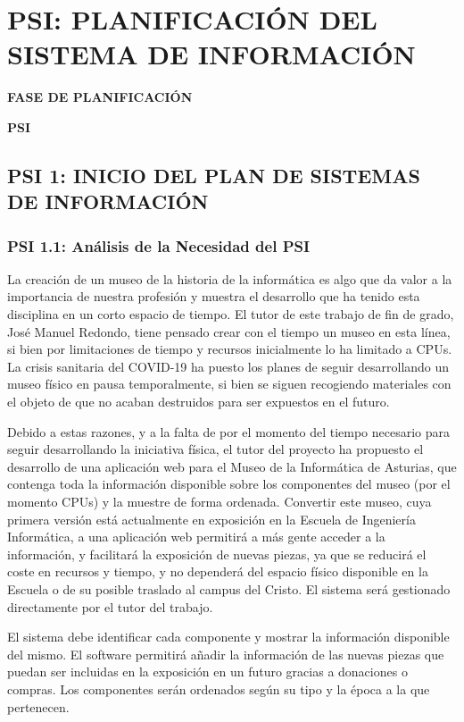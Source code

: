 \pagestyle{fancy}
\chapter{PSI: PLANIFICACIÓN DEL SISTEMA DE INFORMACIÓN}

	\vspace{2cm}	
	\begin{center}
	{\Large \textbf{FASE DE PLANIFICACIÓN} \par}
	\end{center}
	\vspace{5cm}
	
	\begin{center}
	\Huge \textbf{PSI}\par
	\end{center}

\newpage

\section{PSI 1: INICIO DEL PLAN DE SISTEMAS DE INFORMACIÓN}

\subsection{PSI 1.1: Análisis de la Necesidad del PSI} 
La creación de un museo de la historia de la informática es algo que da valor a la importancia de nuestra profesión y muestra el desarrollo que ha tenido esta disciplina en un corto espacio de tiempo. El tutor de este trabajo de fin de grado, José Manuel Redondo, tiene pensado crear con el tiempo un museo en esta línea, si bien por limitaciones de tiempo y recursos inicialmente lo ha limitado a CPUs. La crisis sanitaria del COVID-19 ha puesto los planes de seguir desarrollando un museo físico en pausa temporalmente, si bien se siguen recogiendo materiales con el objeto de que no acaban destruidos para ser expuestos en el futuro.\par
Debido a estas razones, y a la falta de por el momento del tiempo necesario para seguir desarrollando la iniciativa física, el tutor del proyecto ha propuesto el desarrollo de una aplicación web para el Museo de la Informática de Asturias, que contenga toda la información disponible sobre los componentes del museo (por el momento CPUs) y la muestre de forma ordenada. Convertir este museo, cuya primera versión está actualmente en exposición en la Escuela de Ingeniería Informática, a una aplicación web permitirá a más gente acceder a la información, y facilitará la exposición de nuevas piezas, ya que se reducirá el coste en recursos y tiempo, y no dependerá del espacio físico disponible en la Escuela o de su posible traslado al campus del Cristo. El sistema será gestionado directamente por el tutor del trabajo.
\par El sistema debe identificar cada componente y mostrar la información disponible del mismo. El software permitirá añadir la información de las nuevas piezas que puedan ser incluidas en la exposición en un futuro gracias a donaciones o compras. Los componentes serán ordenados según su tipo y la época a la que pertenecen. 

